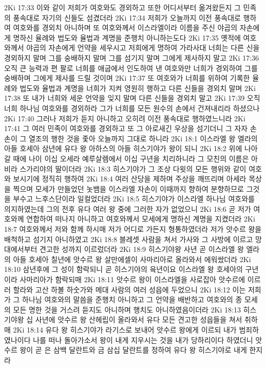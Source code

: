 2Ki 17:33  이와 같이 저희가 여호와도 경외하고 또한 어디서부터 옮겨왔든지 그 민족의 풍속대로 자기의 신들도 섬겼더라
2Ki 17:34  저희가 오늘까지 이전 풍속대로 행하여 여호와를 경외치 아니하며 또 여호와께서 이스라엘이라 이름을 주신 야곱의 자손에게 명하신 율례와 법도와 율법과 계명을 준행치 아니하는도다
2Ki 17:35  옛적에 여호와께서 야곱의 자손에게 언약을 세우시고 저희에게 명하여 가라사대 너희는 다른 신을 경외하지 말며 그를 숭배하지 말며 그를 섬기지 말며 그에게 제사하지 말고
2Ki 17:36  오직 큰 능력과 편 팔로 너희를 애굽에서 인도하여 낸 여호와만 너희가 경외하여 그를 숭배하며 그에게 제사를 드릴 것이며
2Ki 17:37  또 여호와가 너희를 위하여 기록한 율례와 법도와 율법과 계명을 너희가 지켜 영원히 행하고 다른 신들을 경외치 말며
2Ki 17:38  또 내가 너희와 세운 언약을 잊지 말며 다른 신들을 경외치 말고
2Ki 17:39  오직 너희 하나님 여호와를 경외하라 그가 너희를 모든 원수의 손에서 건져내리라 하셨으나
2Ki 17:40  그러나 저희가 듣지 아니하고 오히려 이전 풍속대로 행하였느니라
2Ki 17:41  그 여러 민족이 여호와를 경외하고 또 그 아로새긴 우상을 섬기더니 그 자자 손손이 그 열조의 행한 것을 좇아 오늘까지 그대로 하니라
2Ki 18:1  이스라엘 왕 엘라의 아들 호세아 삼년에 유다 왕 아하스의 아들 히스기야가 왕이 되니
2Ki 18:2  위에 나아갈 때에 나이 이십 오세라 예루살렘에서 이십 구년을 치리하니라 그 모친의 이름은 아비라 스가리야의 딸이더라
2Ki 18:3  히스기야가 그 조상 다윗의 모든 행위와 같이 여호와 보시기에 정직히 행하여
2Ki 18:4  여러 산당을 제하며 주상을 깨뜨리며 아세라 목상을 찍으며 모세가 만들었던 놋뱀을 이스라엘 자손이 이때까지 향하여 분향하므로 그것을 부수고 느후스단이라 일컬었더라
2Ki 18:5  히스기야가 이스라엘 하나님 여호와를 의지하였는데 그의 전후 유다 여러 왕 중에 그러한 자가 없었으니
2Ki 18:6  곧 저가 여호와께 연합하여 떠나지 아니하고 여호와께서 모세에게 명하신 계명을 지켰더라
2Ki 18:7  여호와께서 저와 함께 하시매 저가 어디로 가든지 형통하였더라 저가 앗수르 왕을 배척하고 섬기지 아니하였고
2Ki 18:8  블레셋 사람을 쳐서 가사와 그 사방에 이르고 망대에서부터 견고한 성까지 이르렀더라
2Ki 18:9  히스기야왕 사년 곧 이스라엘 왕 엘라의 아들 호세아 칠년에 앗수르 왕 살만에셀이 사마리아로 올라와서 에워쌌더라
2Ki 18:10  삼년후에 그 성이 함락되니 곧 히스기야의 육년이요 이스라엘 왕 호세아의 구년이라 사마리아가 함락되매
2Ki 18:11  앗수르 왕이 이스라엘을 사로잡아 앗수르에 이르러 할라와 고산 하볼 하숫가와 메대 사람의 여러 성읍에 두었으니
2Ki 18:12  이는 저희가 그 하나님 여호와의 말씀을 준행치 아니하고 그 언약을 배반하고 여호와의 종 모세의 모든 명한 것을 거스려 듣지도 아니하며 행치도 아니하였음이더라
2Ki 18:13  히스기야왕 십 사년에 앗수르 왕 산헤립이 올라와서 유다 모든 견고한 성읍들을 쳐서 취하매
2Ki 18:14  유다 왕 히스기야가 라기스로 보내어 앗수르 왕에게 이르되 내가 범죄하였나이다 나를 떠나 돌아가소서 왕이 내게 지우시는 것을 내가 당하리이다 하였더니 앗수르 왕이 곧 은 삼백 달란트와 금 삼십 달란트를 정하여 유다 왕 히스기야로 내게 한지라
